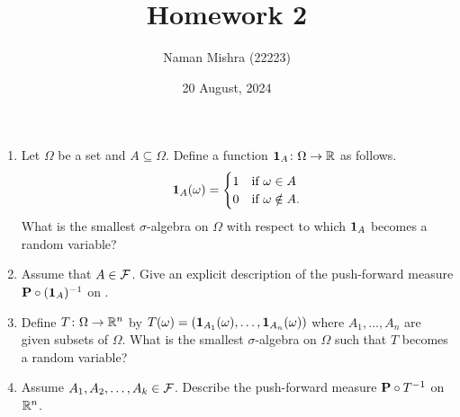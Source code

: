\documentclass[12pt]{article}
\title{Homework 2}
\author{Naman Mishra (22223)}
\date{20 August, 2024}
\begin{document}
\maketitle

\begin{problem*} \leavevmode
    \begin{enumerate}
        \item Let $\Omega$ be a set and $A \subseteq \Omega$.
        Define a function $\1A\colon \Omega \to \R$ as follows. \[
            \1A(\omega) = \begin{cases}
                1 & \text{if } \omega \in A \\
                0 & \text{if } \omega \notin A.
            \end{cases}
        \] What is the smallest $\sigma$-algebra on $\Omega$ with respect to
        which $\1A$ becomes a random variable?
        \item Assume that $A \in \F$.
        Give an explicit description of the push-forward measure
        ${\P} \circ (\1A)^{-1}$ on \R.
        \item Define $T\colon \Omega \to \R^n$ by
        $T(\omega) = (\1{A_1}(\omega), \dots, \1{A_n}(\omega))$ where
        $A_1, \dots, A_n$ are given subsets of $\Omega$.
        What is the smallest $\sigma$-algebra on $\Omega$ such that $T$
        becomes a random variable?
        \item Assume $A_1, A_2, \dots, A_k \in \F$.
        Describe the push-forward measure ${\P} \circ T^{-1}$ on $\R^n$.
    \end{enumerate}
\end{problem*}
\end{document}
